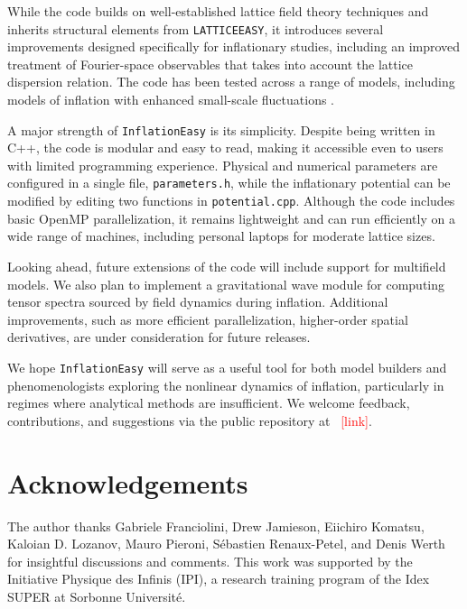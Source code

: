 \documentclass[aps, nofootinbib,superscriptaddress, preprintnumbers, longbibliography]{article}
\begin{document}
While the code builds on well-established lattice field theory techniques and inherits structural elements from \texttt{LATTICEEASY}, it introduces several improvements designed specifically for inflationary studies, including an improved treatment of Fourier-space observables that takes into account the lattice dispersion relation. The code has been tested across a range of models, including models of inflation with enhanced small-scale fluctuations \cite{Caravano:2024moy,Caravano:2024tlp,USR2}.

A major strength of \texttt{InflationEasy} is its simplicity. Despite being written in C++, the code is modular and easy to read, making it accessible even to users with limited programming experience. Physical and numerical parameters are configured in a single file, \texttt{parameters.h}, while the inflationary potential can be modified by editing two functions in \texttt{potential.cpp}. Although the code includes basic OpenMP parallelization, it remains lightweight and can run efficiently on a wide range of machines, including personal laptops for moderate lattice sizes.

Looking ahead, future extensions of the code will include support for multifield models. We also plan to implement a gravitational wave module for computing tensor spectra sourced by field dynamics during inflation. Additional improvements, such as more efficient parallelization, higher-order spatial derivatives, are under consideration for future releases.

We hope \texttt{InflationEasy} will serve as a useful tool for both model builders and phenomenologists exploring the nonlinear dynamics of inflation, particularly in regimes where analytical methods are insufficient. We welcome feedback, contributions, and suggestions via the public repository at ~\textcolor{red}{[link]}.

	\section*{Acknowledgements}
	
	The author thanks Gabriele Franciolini, Drew Jamieson, Eiichiro Komatsu, Kaloian D. Lozanov, Mauro Pieroni, S\'ebastien Renaux-Petel, and Denis Werth for insightful discussions and comments. This work was supported by the Initiative Physique des Infinis (IPI), a research training program of the Idex SUPER at Sorbonne Universit\'e.
	
	
	
	
\end{document}
